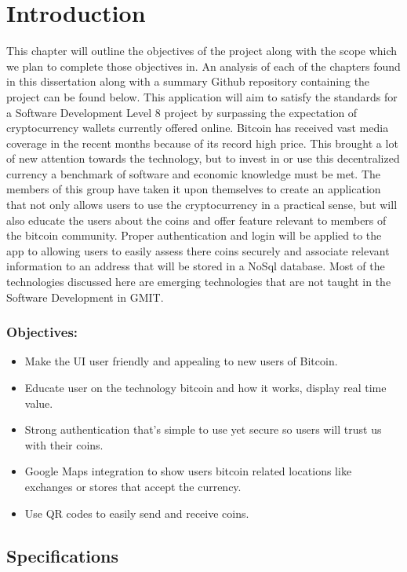 \chapter{Introduction}
This chapter will outline the objectives of the project along with the scope which we plan to complete those objectives in. An analysis of each of the chapters found in this dissertation along with a summary Github repository containing the project can be found below. This application will aim to satisfy the standards for a Software Development Level 8 project by surpassing the expectation of cryptocurrency wallets currently offered online. Bitcoin has received vast media coverage in the recent months because of its record high price. This brought a lot of new attention towards the technology, but to invest in or use this decentralized currency a benchmark of software and economic knowledge must be met. The members of this group have taken it upon themselves to create an application that not only allows users to use the cryptocurrency in a practical sense, but will also educate the users about the coins and offer feature relevant to members of the bitcoin community. Proper authentication and login will be applied to the app to allowing users to easily assess there coins securely and associate relevant information to an address that will be stored in a NoSql database. Most of the technologies discussed here are emerging technologies that are not taught in the Software Development in GMIT.

\subsection{Objectives:}
\begin{itemize}
  \item Make the UI user friendly and appealing to new users of Bitcoin.
  \item Educate user on the technology bitcoin and how it works, display real time value.
  \item Strong authentication that’s simple to use yet secure so users will trust us with their coins.
  \item Google Maps integration to show users bitcoin related locations like exchanges or stores that accept the currency.
  \item Use QR codes to easily send and receive coins.
\end{itemize}

\section{Specifications}
